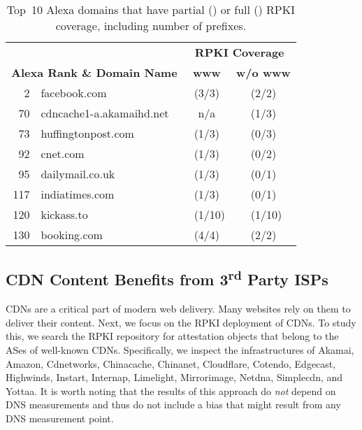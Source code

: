 \begin{table}
\center
\small
\begin{tabular}{rlcc}
\toprule
& & \multicolumn{2}{c}{\textbf{RPKI Coverage}}
\\
\cmidrule{3-4}
\multicolumn{2}{l}{\textbf{Alexa Rank \& Domain Name}} & \textbf{www} & \textbf{w/o www}
\\
2 & facebook.com & \cmark\xspace(3/3) & \cmark\xspace (2/2)
\\
70 & cdncache1-a.akamaihd.net & n/a & \pmark\xspace (1/3)
\\
73 & huffingtonpost.com & \pmark\xspace (1/3) & \xmark\xspace (0/3)
\\
92 & cnet.com & \pmark\xspace (1/3) & \xmark\xspace (0/2)
\\
95 & dailymail.co.uk & \pmark\xspace (1/3) & \xmark\xspace (0/1)
\\
117 & indiatimes.com & \pmark\xspace (1/3) & \xmark\xspace (0/1)
\\
120 & kickass.to & \ \pmark\xspace (1/10) & \ \pmark\xspace (1/10)
\\
130 & booking.com & \cmark\xspace (4/4) & \cmark\xspace (2/2)
\\
\bottomrule

\end{tabular}
\caption{Top~10 Alexa domains that have partial (\pmark) or
full (\cmark) RPKI coverage, including number of prefixes.}
\label{tbl:top10rpkisites}
\end{table}








\subsection{CDN Content Benefits from 3\textsuperscript{rd} Party ISPs}


CDNs are a critical part of modern web delivery. Many websites rely on them to deliver their content.
Next, we focus on the RPKI deployment of CDNs. To study this, we search the RPKI repository for attestation
objects that belong to the ASes of well-known CDNs. Specifically, we inspect the infrastructures of Akamai, Amazon,
Cdnetworks, Chinacache, Chinanet, Cloudflare, Cotendo, Edgecast, Highwinds,
Instart, Internap, Limelight, Mirrorimage, Netdna, Simplecdn, and Yottaa.
It is worth noting that the results of this approach do \emph{not} depend
on DNS measurements and thus do not include a bias that might
result from any DNS measurement point.









